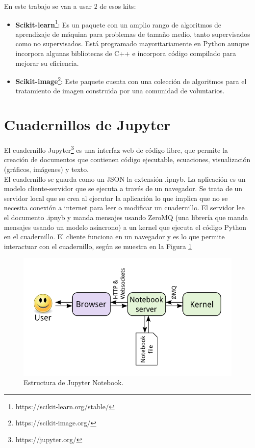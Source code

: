 \documentclass[a4paper,12pt]{report}
\begin{document}
En este trabajo se van a usar 2 de esos kits:\\


\begin{itemize}

	\item \textbf{Scikit-learn}\footnote{https://scikit-learn.org/stable/}: Es un paquete con un amplio rango de algoritmos de aprendizaje de máquina para problemas de tamaño medio, tanto supervisados como no supervisados. Está programado mayoritariamente en Python aunque incorpora algunas bibliotecas de C++ e incorpora código compilado para mejorar su eficiencia.

	\item \textbf{Scikit-image}\footnote{https://scikit-image.org/}: Este paquete cuenta con una colección de algoritmos para el tratamiento de imagen construida por una comunidad de voluntarios.
\end{itemize}
\section{ Cuadernillos de Jupyter}

El cuadernillo Jupyter\footnote{https://jupyter.org/} es una interfaz web de código libre, que permite la creación de documentos que contienen código ejecutable, ecuaciones, visualización (gráficos, imágenes) y texto.\\

El cuadernillo se guarda como un JSON la extensión .ipnyb. La aplicación es un modelo cliente-servidor que se ejecuta a través de un navegador. Se trata de un servidor local que se crea al ejecutar la aplicación lo que implica que no se necesita conexión a internet para leer o modificar un cuadernillo.  El servidor lee el documento .ipnyb y manda mensajes usando ZeroMQ (una librería que manda mensajes usando un modelo asíncrono) a un kernel que ejecuta el código Python en el cuadernillo. El cliente funciona en un navegador y es lo que permite interactuar con el cuadernillo, según se muestra en la Figura \ref{estructurajupyter}

\begin{figure}[h]
\centering
\includegraphics[width=1.0\textwidth]{imagenes/estructurajupyter}
\caption{Estructura de Jupyter Notebook.}
\label{estructurajupyter}
\end{figure}
\end{document}
